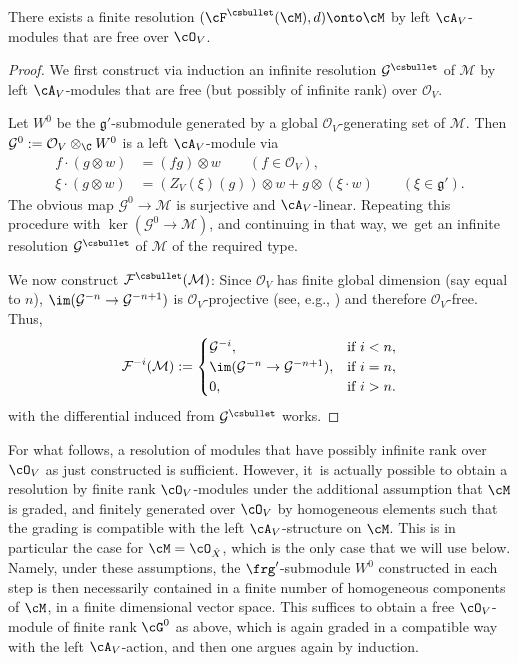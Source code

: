 \begin{lem}
There exists a finite resolution $(\cF^{\csbullet}(\cM), d)\onto \cM$ by left $\cA_V$\nobreakdash-mod\-ules that are free over $\cO_V$.
\end{lem}

\begin{proof}
We first construct via induction an infinite resolution $\mathcal{G}^{\csbullet}$ of $\mathcal{M}$ by left $\cA_V$\nobreakdash-mod\-ules that are free (but possibly of infinite rank) over $\mathcal{O}_V$.

Let $W^0$ be the $\mathfrak{g}'$-submodule generated by a global $\mathcal{O}_V$-generating set of $\mathcal{M}$. Then $\mathcal{G}^0:=\mathcal{O}_V\otimes_\C W^0$ is a left $\cA_V$\nobreakdash-mod\-ule via
\begin{align*}
f\cdot (g\otimes w) &= (fg)\otimes w \qquad (f\in \mathcal{O}_V),\\
\xi\cdot (g\otimes w) &= (Z_V(\xi)(g))\otimes w + g \otimes (\xi\cdot w) \qquad (\xi\in \mathfrak{g}').
\end{align*}
The obvious map $\mathcal{G}^0\to \mathcal{M}$ is surjective and $\cA_V$-linear. Repeating this procedure with $\ker(\mathcal{G}^0\to \mathcal{M})$, and continuing in that way, we~get an infinite resolution $\mathcal{G}^{\csbullet}$ of $\mathcal{M}$ of the required type.

We now construct $\mathcal{F}^{\csbullet}(\mathcal{M})$: Since $\mathcal{O}_V$ has finite global dimension (say equal to $n$), $\im(\mathcal{G}^{-n}\to\mathcal{G}^{-n+1})$ is $\mathcal{O}_V$-projective (see, e.g., \cite[\href{https://stacks.math.columbia.edu/tag/00O5}{Lemma 00O5}]{stacks-project}) and therefore $\mathcal{O}_V$-free. Thus,
\[
\mathcal{F}^{-i}(\mathcal{M})
:= 
\begin{cases}
\mathcal{G}^{-i}, &\text{if }i<n,\\
\im(\mathcal{G}^{-n}\to\mathcal{G}^{-n+1}), &\text{if }i=n,\\
0, &\text{if }i>n.
\end{cases}
\]
with the differential induced from $\mathcal{G}^{\csbullet}$ works.
\end{proof}

\begin{rmk}
For what follows, a resolution of modules that have possibly infinite rank over $\cO_V$ as just constructed is sufficient. However, it~is actually possible to obtain a resolution by finite rank $\cO_V$\nobreakdash-mod\-ules under the additional assumption that $\cM$ is graded,
and finitely generated over $\cO_V$ by homogeneous elements such that the grading is compatible with the left $\cA_V$-structure on $\cM$. This is in particular the case for \hbox{$\cM=\cO_{\hat{X}}$}, which is the only case that we will use below. Namely, under these \hbox{assumptions}, the $\frg'$-submodule $W^0$ constructed in each step is then necessarily contained in a finite number of homogeneous components of $\cM$, \ie in a finite dimensional vector space. This suffices to obtain a free $\cO_V$\nobreakdash-mod\-ule of finite rank $\cG^0$ as above,
which is again graded in a compatible way with the left $\cA_V$-action, and then one argues again by induction.
\end{rmk}

